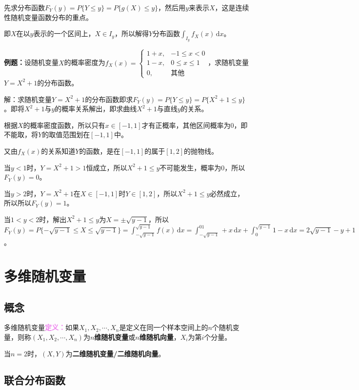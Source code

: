 \documentclass[UTF8, 12pt]{ctexart}
\begin{document}
先求分布函数$F_Y(y)=P\{Y\leqslant y\}=P\{g(X)\leqslant y\}$，然后用$y$来表示$X$，这是连续性随机变量函数分布的重点。

即$X$在以$y$表示的一个区间上，$X\in I_y$，所以解得$Y$分布函数$\int_{I_y}f_X(x)\,\textrm{d}x$。

\textbf{例题：}设随机变量$X$的概率密度为$f_X(x)=\left\{\begin{array}{ll}
    1+x, & -1\leqslant x<0 \\
    1-x, & 0\leqslant x\leqslant1 \\
    0, & \text{其他}
\end{array}\right.$，求随机变量$Y=X^2+1$的分布函数。

解：求随机变量$Y=X^2+1$的分布函数即求$F_Y(y)=P\{Y\leqslant y\}=P\{X^2+1\leqslant y\}$。即将$X^2+1$与$y$的概率关系解出，即求曲线$X^2+1$与直线$y$的关系。

根据$X$的概率密度函数，所以只有$x\in [-1,1]$才有正概率，其他区间概率为0，即不能取，将$Y$的取值范围划在$[-1,1]$中。

又由$f_X(x)$的关系知道$Y$的函数，是在$[-1,1]$的属于$[1,2]$的抛物线。

当$y<1$时，$Y=X^2+1>1$恒成立，所以$X^2+1\leqslant y$不可能发生，概率为0，所以$F_Y(y)=0$。

当$y>2$时，$Y=X^2+1$在$X\in[-1,1]$时$Y\in[1,2]$，所以$X^2+1\leqslant y$必然成立，所以所以$F_Y(y)=1$。

当$1<y<2$时，解出$X^2+1\leqslant y$为$X=\pm\sqrt{y-1}$，所以$F_Y(y)=P\{-\sqrt{y-1}\leqslant X\leqslant\sqrt{y-1}\}=\int_{-\sqrt{y-1}}^{\sqrt{y-1}}f(x)\,\textrm{d}x=\int_{-\sqrt{y-1}}^01+x\,\textrm{d}x+\int_0^{\sqrt{y-1}}1-x\,\textrm{d}x=2\sqrt{y-1}-y+1$。

\section{多维随机变量}

\subsection{概念}

多维随机变量\textcolor{violet}{\textbf{定义：}}如果$X_1,X_2,\cdots,X_n$是定义在同一个样本空间上的$n$个随机变量，则称$(X_1,X_2,\cdots,X_n)$为\textbf{$n$维随机变量}或\textbf{$n$维随机向量}，$X_i$为第$i$个分量。

当$n=2$时，$(X,Y)$为\textbf{二维随机变量/二维随机向量}。

\subsection{联合分布函数}
\end{document}
